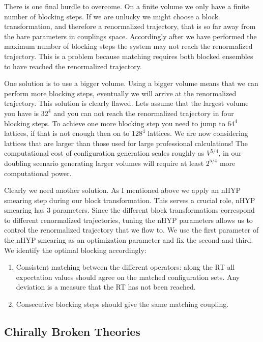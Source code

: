 There is one final hurdle to overcome.
On a finite volume we only have a finite number of blocking steps.
If we are unlucky we might choose a block transformation, and therefore a renormalized trajectory, that is so far away from the bare parameters in couplings space.
Accordingly after we have performed the maximum number of blocking steps the system may not reach the renormalized trajectory.
This is a problem because matching requires both blocked ensembles to have reached the renormalized trajectory.

One solution is to use a bigger volume.
Using a bigger volume means that we can perform more blocking steps, eventually we will arrive at the renormalized trajectory.
This solution is clearly flawed.
Lets assume that the largest volume you have is $32^4$ and you can not reach the renormalized trajectory in four blocking steps.
To achieve one more blocking step you need to jump to $64^4$ lattices, if that is not enough then on to $128^4$ lattices.
We are now considering lattices that are larger than those used for large professional calculations!
The computational cost of configuration generation scales roughly as $V^{5/4}$, in our doubling scenario generating larger volumes will require at least $2^{5/4}$ more computational power.

Clearly we need another solution.
As I mentioned above we apply an nHYP smearing step during our block transformation.
This serves a crucial role, nHYP smearing has 3 parameters.
Since the different block transformations correspond to different renormalized trajectories, tuning the nHYP parameters allows us to control the renormalized trajectory that we flow to.
We use the first parameter of the nHYP smearing as an optimization parameter and fix the second and third.
We identify the optimal blocking accordingly:
\begin{enumerate}
  \item Consistent matching between the different operators: along the RT all expectation values should agree on the matched configuration sets. Any deviation is a measure that the RT has not been reached.
  \item Consecutive blocking steps should give the same matching coupling.
\end{enumerate}

\subsection{Chirally Broken Theories}

